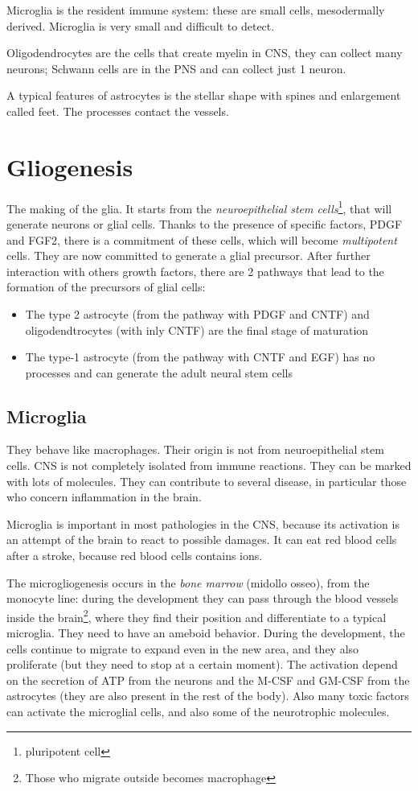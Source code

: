 \documentclass[a4paper, 12pt]{book}
\begin{document}
Microglia is the resident immune system: these are small cells, mesodermally derived. Microglia is very small and difficult to detect.

Oligodendrocytes are the cells that create myelin in CNS, they can collect many neurons; Schwann cells are in the PNS and  can collect just 1 neuron.

A typical features of astrocytes is the stellar shape with spines and enlargement called feet. The processes contact the vessels.

 \section{Gliogenesis}
The making of the glia. It starts from the \emph{neuroepithelial stem cells}\footnote{pluripotent cell}, that will generate neurons or glial cells. Thanks to the presence of specific factors, PDGF and FGF2, there is a commitment of these cells, which will become \emph{multipotent} cells. They are now committed to generate a glial precursor. After further interaction with others growth factors, there are 2 pathways that lead to the formation of the precursors of glial cells:
\begin{itemize}
\item{The type 2  astrocyte (from the pathway with PDGF and CNTF)  and oligodendtrocytes (with inly CNTF) are the final stage of maturation}
\item{The type-1 astrocyte (from the pathway with CNTF and EGF) has no processes and can generate the adult neural stem cells}
\end{itemize}

\subsection{Microglia}
They behave like macrophages. Their origin is not from neuroepithelial stem cells. CNS is not completely isolated from immune reactions. They can be marked with lots of molecules. They can contribute to several disease, in particular those who concern inflammation in the brain.

Microglia is important in most pathologies in the CNS, because its activation is an attempt of the brain to react to possible damages. It can eat red blood cells after a stroke, because red blood cells contains ions.

The microgliogenesis  occurs in the \emph{bone marrow} (midollo osseo),  from the monocyte line: during the development they can pass through the blood vessels inside the brain\footnote{Those who migrate outside becomes macrophage}, where they find their position and differentiate to a typical microglia. They need to have an ameboid behavior. During the development, the cells continue to migrate to expand even in the new area, and they also proliferate (but they need to stop at a certain moment). The activation depend on the secretion of ATP from the neurons and the M-CSF and GM-CSF from the astrocytes (they are also present in the rest of the body). Also many toxic factors can activate the microglial cells, and also some of the neurotrophic molecules.
\end{document}
